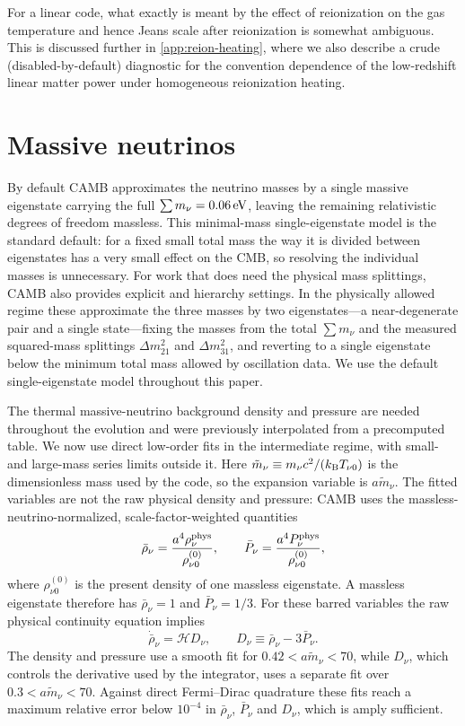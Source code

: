 \documentclass[prd, twocolumn, superscriptaddress, tightenlines, longbibliography, nofootinbib, eqsecnum, amsfonts, amsmath, floatfix, notitlepage]{revtex4-2}
\newcommand{\code}[1]{\texttt{\detokenize{#1}}}
\begin{document}
For a linear code, what exactly is meant by the effect of reionization on the gas temperature
and hence Jeans scale after reionization is somewhat ambiguous. This is discussed further in \cref{app:reion-heating},
where we also describe a crude (disabled-by-default) diagnostic for the convention dependence of the low-redshift linear matter power under homogeneous reionization heating.

\section{Massive neutrinos}
\label{sec:neutrinos}

By default \textsc{CAMB} approximates the neutrino masses by a single massive
eigenstate carrying the full $\sum m_\nu = 0.06\,{\rm eV}$, leaving the remaining
relativistic degrees of freedom massless. This minimal-mass single-eigenstate model
is the standard default: for a fixed small total mass the way it is divided between
eigenstates has a very small effect on the CMB, so resolving the individual masses
is unnecessary. For work that does need the physical mass splittings, \textsc{CAMB}
also provides explicit \code{normal} and \code{inverted} hierarchy settings. In the
physically allowed regime these approximate the three masses by two eigenstates---a
near-degenerate pair and a single state---fixing the masses from the total
$\sum m_\nu$ and the measured squared-mass splittings $\Delta m^2_{21}$ and
$\Delta m^2_{31}$, and reverting to a single eigenstate below the minimum total mass
allowed by oscillation data. We use the default single-eigenstate model throughout
this paper.

The thermal massive-neutrino background density and pressure are needed throughout
the evolution and were previously interpolated from a precomputed table. We now use
direct low-order fits in the intermediate regime, with small- and large-mass
series limits outside it. Here \(\tilde m_\nu\equiv m_\nu c^2/(k_{\rm B}T_{\nu0})\) is
the dimensionless mass used by the code, so the expansion variable is
\(a\tilde m_\nu\). The fitted variables are not the raw physical density and pressure:
\textsc{CAMB} uses the massless-neutrino-normalized, scale-factor-weighted
quantities
\begin{equation}
  \bar\rho_\nu=\frac{a^4\rho_\nu^{\rm phys}}{\rho_{\nu0}^{(0)}},\qquad
  \bar P_\nu=\frac{a^4P_\nu^{\rm phys}}{\rho_{\nu0}^{(0)}},
\end{equation}
where \(\rho_{\nu0}^{(0)}\) is the present density of one massless eigenstate. A
massless eigenstate therefore has \(\bar\rho_\nu=1\) and
\(\bar P_\nu=1/3\). For these barred variables the raw physical continuity
equation implies
\begin{equation}
  \dot{\bar\rho}_\nu=\mathcal H D_\nu,\qquad
  D_\nu\equiv\bar\rho_\nu-3\bar P_\nu .
\end{equation}
The density and pressure use a smooth fit for \(0.42<a\tilde m_\nu<70\), while
\(D_\nu\), which controls the derivative used by the integrator, uses a separate
fit over \(0.3<a\tilde m_\nu<70\). Against direct Fermi--Dirac quadrature these fits
reach a maximum relative error below \(10^{-4}\) in \(\bar\rho_\nu\),
\(\bar P_\nu\) and \(D_\nu\), which is amply sufficient.
\end{document}
